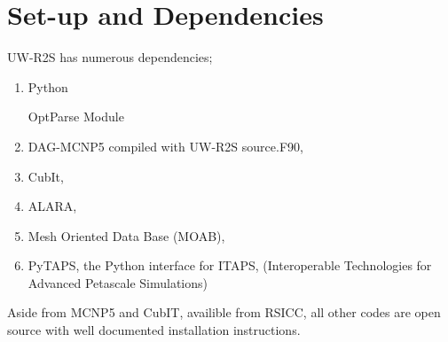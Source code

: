 \documentclass{article}
\begin{document}
\section{Set-up and Dependencies}
UW-R2S has numerous dependencies;
\begin{enumerate}
\item{Python}
\begin{itemize} OptParse Module \end{itemize}
\item{DAG-MCNP5 compiled with UW-R2S source.F90},
\item{CubIt},
\item{ALARA},
\item{Mesh Oriented Data Base (MOAB)},
\item{PyTAPS, the Python interface for ITAPS, (Interoperable Technologies for Advanced Petascale Simulations)}
\end{enumerate}

Aside from MCNP5 and CubIT, availible from RSICC, all other codes are open source with well documented installation instructions.
\end{document}
